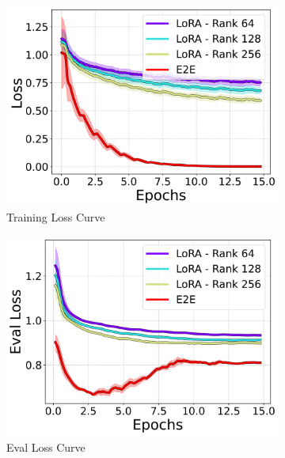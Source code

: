\documentclass[10pt,twocolumn,letterpaper]{article}
\begin{document}
\begin{figure}[t]
    \centering
    \begin{subfigure}[b]{0.24\textwidth}
        \centering
        \includegraphics[width=\textwidth]{./lora_comparison/loss_line.png}
        \caption{Training Loss Curve}
    \end{subfigure}
    \begin{subfigure}[b]{0.24\textwidth}
        \centering
        \includegraphics[width=\textwidth]{./lora_comparison/eval_loss_line.png}
        \caption{Eval Loss Curve}
    \end{subfigure}
    \begin{subfigure}[b]{0.24\textwidth}
        \centering

\end{subfigure}
\end{figure}
\end{document}
